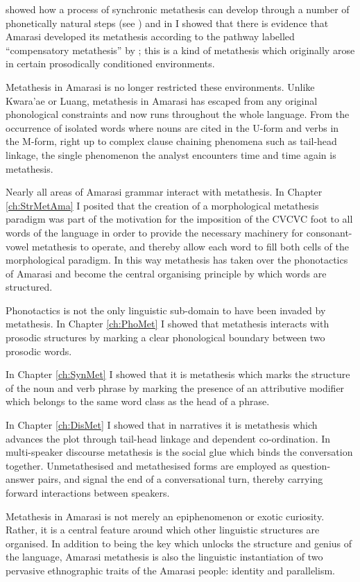 \cite{blga98} showed how a process of synchronic metathesis
can develop through a number of phonetically natural steps (see )
and in  I showed that there is evidence
that Amarasi developed its metathesis according to the pathway labelled ``compensatory metathesis'' by \cite{blga98};
this is a kind of metathesis which originally arose in certain prosodically conditioned environments.

Metathesis in Amarasi is no longer restricted these environments.
Unlike Kwara'ae or Luang, metathesis in Amarasi has
escaped from any original phonological constraints
and now runs throughout the whole language.
From the occurrence of isolated words
where nouns are cited in the U-form and verbs in the M-form,
right up to complex clause chaining phenomena such as tail-head linkage,
the single phenomenon the analyst encounters time and time again is metathesis.

Nearly all areas of Amarasi grammar interact with metathesis.
In Chapter \ref{ch:StrMetAma} I posited that the creation of a morphological metathesis paradigm
was part of the motivation for the imposition of the CVCVC foot to all words of the language
in order to provide the necessary machinery for consonant-vowel metathesis to operate,
and thereby allow each word to fill both cells of the morphological paradigm.
In this way metathesis has taken over the phonotactics of Amarasi
and become the central organising principle by which words are structured.

Phonotactics is not the only linguistic sub-domain to have been invaded by metathesis.
In Chapter \ref{ch:PhoMet} I showed that metathesis
interacts with prosodic structures by marking a clear
phonological boundary between two prosodic words.

In Chapter \ref{ch:SynMet} I showed that
it is metathesis which marks the structure of the noun and verb phrase
by marking the presence of an attributive modifier
which belongs to the same word class as the head of a phrase.

In Chapter \ref{ch:DisMet} I showed that in narratives
it is metathesis which advances the plot through tail-head linkage
and dependent co-ordination.
In multi-speaker discourse metathesis is the social glue which binds the conversation together.
Unmetathesised and metathesised forms are employed as question-answer pairs,
and signal the end of a conversational turn,
thereby carrying forward interactions between speakers.

Metathesis in Amarasi is not merely
an epiphenomenon or exotic curiosity.
Rather, it is a central feature around which other linguistic structures are organised.
In addition to being the key which unlocks the structure and genius
of the language, Amarasi metathesis is also the linguistic instantiation of two pervasive
ethnographic traits of the Amarasi people: identity and parallelism.